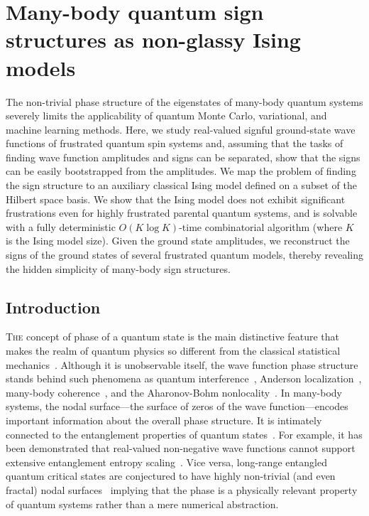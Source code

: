 \openleft%
\chapter[Many-body quantum sign structures as non-glassy Ising \ \ \ models][Many-body quantum sign structures as non-glassy Ising models]{Many-body quantum sign structures as non-glassy Ising models}\label{ch:cp23}

{\small The non-trivial phase structure of the eigenstates of many-body quantum systems severely limits the applicability of quantum Monte Carlo, variational, and machine learning methods. Here, we study real-valued signful ground-state wave functions of frustrated quantum spin systems and, assuming that the tasks of finding wave function amplitudes and signs can be separated, show that the signs can be easily bootstrapped from the amplitudes. We map the problem of finding the sign structure to an auxiliary classical Ising model defined on a subset of the Hilbert space basis. We show that the Ising model does not exhibit significant frustrations even for highly frustrated parental quantum systems, and is solvable with a fully deterministic $O(K\log K)$-time combinatorial algorithm (where $K$ is the Ising model size). Given the ground state amplitudes, we reconstruct the signs of the ground states of several frustrated quantum models, thereby revealing the hidden simplicity of many-body sign structures.}

\clearpage

\section{Introduction}

\lettrine[lines=3]{T}{he} concept of phase of a quantum state is the main distinctive feature that makes the realm of quantum physics so different from the classical statistical mechanics~\cite{quantum_phase}. Although it is unobservable itself, the wave function phase structure stands behind such phenomena as quantum interference~\cite{interference}, Anderson localization~\cite{localization}, many-body coherence~\cite{coherence}, and the Aharonov-Bohm nonlocality~\cite{Aharonov-Bohm,olariu}. In many-body systems, the nodal surface---the surface of zeros of the wave function---encodes important information about the overall phase structure. It is intimately connected to the entanglement properties of quantum states~\cite{Kaplis}. For example, it has been demonstrated that real-valued non-negative wave functions cannot support extensive entanglement entropy scaling~\cite{Grover}. Vice versa, long-range entangled quantum critical states are conjectured to have highly non-trivial (and even fractal) nodal surfaces~\cite{fractals} implying that the phase is a physically relevant property of quantum systems rather than a mere numerical abstraction.

